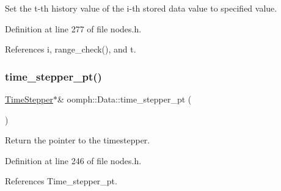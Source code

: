 Set the t-\/th history value of the i-\/th stored data value to specified value. 



Definition at line 277 of file nodes.\+h.



References i, range\+\_\+check(), and t.

\mbox{\label{classoomph_1_1Data_a5b34970d16205921dca3ada720da8445}} 
\subsubsection{\texorpdfstring{time\+\_\+stepper\+\_\+pt()}{time\_stepper\_pt()}\hspace{0.1cm}{\footnotesize\ttfamily [1/2]}}
{\footnotesize\ttfamily \hyperlink{classoomph_1_1TimeStepper}{Time\+Stepper}$\ast$\& oomph\+::\+Data\+::time\+\_\+stepper\+\_\+pt (\begin{DoxyParamCaption}{ }\end{DoxyParamCaption})\hspace{0.3cm}{\ttfamily [inline]}}



Return the pointer to the timestepper. 



Definition at line 246 of file nodes.\+h.



References Time\+\_\+stepper\+\_\+pt.



